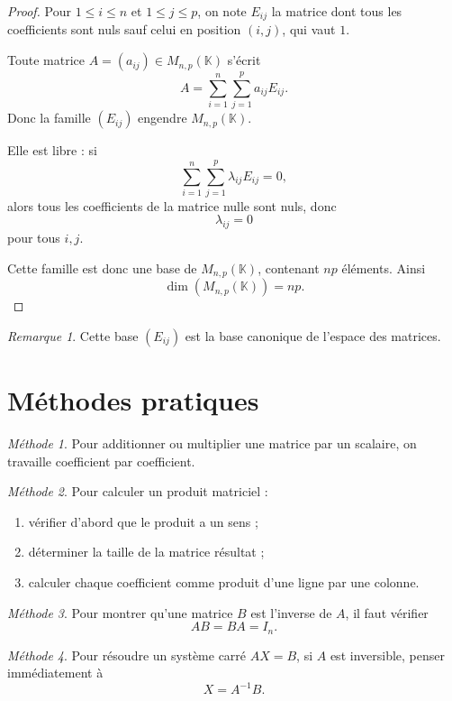 \documentclass[11pt,a4paper]{article}
\theoremstyle{remark}
\newtheorem{remarque}[definition]{Remarque}
\newtheorem*{methode}{Méthode}
\newcommand{\K}{\mathbb{K}}
\begin{document}
\begin{proof}
Pour \(1\le i\le n\) et \(1\le j\le p\), on note \(E_{ij}\) la matrice dont tous les coefficients sont nuls sauf celui en position \((i,j)\), qui vaut \(1\).

Toute matrice \(A=(a_{ij})\in M_{n,p}(\K)\) s’écrit
\[
A=\sum_{i=1}^n\sum_{j=1}^p a_{ij}E_{ij}.
\]
Donc la famille \((E_{ij})\) engendre \(M_{n,p}(\K)\).

Elle est libre : si
\[
\sum_{i=1}^n\sum_{j=1}^p \lambda_{ij}E_{ij}=0,
\]
alors tous les coefficients de la matrice nulle sont nuls, donc
\[
\lambda_{ij}=0
\]
pour tous \(i,j\).

Cette famille est donc une base de \(M_{n,p}(\K)\), contenant \(np\) éléments. Ainsi
\[
\dim(M_{n,p}(\K))=np.
\]
\end{proof}

\begin{remarque}
Cette base \((E_{ij})\) est la base canonique de l’espace des matrices.
\end{remarque}

\section{Méthodes pratiques}

\begin{methode}
Pour additionner ou multiplier une matrice par un scalaire, on travaille coefficient par coefficient.
\end{methode}

\begin{methode}
Pour calculer un produit matriciel :
\begin{enumerate}
    \item vérifier d’abord que le produit a un sens ;
    \item déterminer la taille de la matrice résultat ;
    \item calculer chaque coefficient comme produit d’une ligne par une colonne.
\end{enumerate}
\end{methode}

\begin{methode}
Pour montrer qu’une matrice \(B\) est l’inverse de \(A\), il faut vérifier
\[
AB=BA=I_n.
\]
\end{methode}

\begin{methode}
Pour résoudre un système carré \(AX=B\), si \(A\) est inversible, penser immédiatement à
\[
X=A^{-1}B.
\]
\end{methode}
\end{document}
